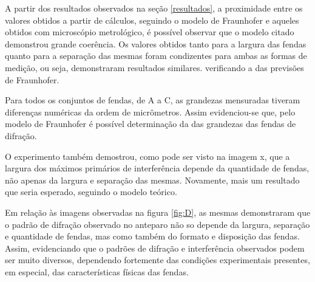 A partir dos resultados observados na seção \ref{resultados}, a proximidade entre os valores obtidos a partir de cálculos, seguindo o modelo de Fraunhofer e aqueles obtidos com microscópio metrológico, é possível observar que o modelo citado demonstrou grande coerência. Os valores obtidos tanto para a largura das fendas quanto para a separação das mesmas foram condizentes para ambas as formas de medição, ou seja, demonstraram resultados similares. verificando a das previsões de Fraunhofer.

Para todos os conjuntos de fendas, de A a C, as grandezas mensuradas tiveram diferenças numéricas da ordem de micrômetros. Assim evidenciou-se que, pelo modelo de Fraunhofer é possível determinação da das grandezas das fendas de difração.

O experimento também demostrou, como pode ser visto na imagem x, que a largura dos máximos primários de interferência depende da quantidade de fendas, não apenas da largura e separação das mesmas. Novamente, mais um resultado que seria esperado, seguindo o modelo teórico.

Em relação às imagens observadas na figura \ref{fig:D}, as mesmas demonstraram que o padrão de difração observado no anteparo não so depende da largura, separação e quantidade de fendas, mas como também do formato e disposição das fendas. Assim, evidenciando que o padrões de difração e interferência observados podem ser muito diversos, dependendo fortemente das condições experimentais presentes, em especial, das características físicas das fendas.

